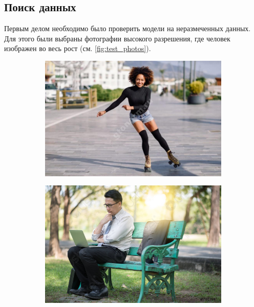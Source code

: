 \subsection{Поиск данных}

Первым делом необходимо было проверить модели на неразмеченных данных. Для этого были выбраны фотографии высокого разрешения, где человек изображен во весь рост (см. \autoref{fig:test_photos}).

\begin{figure}[h]
\begin{subfigure}[b]{.5\textwidth}
	\centering
	\includegraphics[width=\textwidth]{./images/Test/ролики2}
	\caption{ }
\end{subfigure}
\begin{subfigure}[b]{.5\textwidth}
	\centering
   \includegraphics[width=\textwidth]{./images/Test/скамека3}
   \caption{ }
\end{subfigure}

\end{figure}
